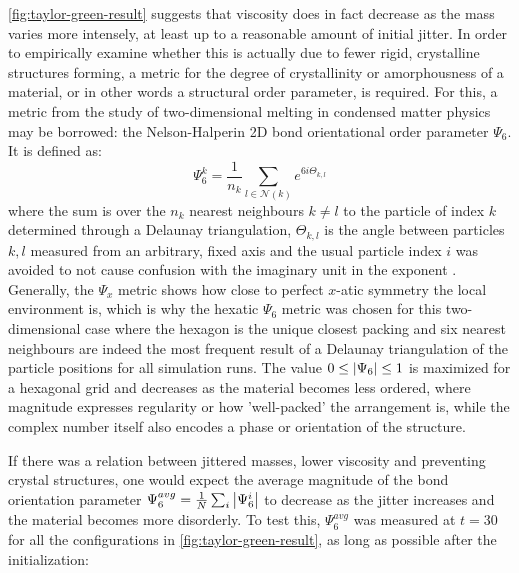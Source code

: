 \begin{samepage}


  \autoref{fig:taylor-green-result} suggests that viscosity does in fact decrease as the mass varies more intensely, at least up to a reasonable amount of initial jitter.
  In order to empirically examine whether this is actually due to fewer rigid, crystalline structures forming, a metric for the degree of crystallinity or amorphousness of a material, or in other words a structural order parameter, is required. For this, a metric from the study of two-dimensional melting in condensed matter physics may be borrowed: the Nelson-Halperin 2D bond orientational order parameter\autocite*{bond-orientational-parameter-pis-6} $\Psi_6$. It is defined as\autocite{nature-psi-6-bond-orientational}:
  \begin{equation}
    \Psi_6^k = \frac{1}{n_k} \sum_{l\in\mathcal{N}(k)}e^{6i\Theta_{k,l}}
  \end{equation}
  where the sum is over the $n_k$ nearest neighbours $k\neq l$ to the particle of index $k$ determined through a Delaunay triangulation, $\Theta_{k,l}$ is the angle between particles $k,l$ measured from an arbitrary, fixed axis and the usual particle index $i$ was avoided to not cause confusion with the imaginary unit in the exponent \autocite*{nature-psi-6-bond-orientational}. Generally, the $\Psi_x$ metric shows how close to perfect $x$-atic symmetry the local environment is, which is why the hexatic $\Psi_6$ metric was chosen for this two-dimensional case where the hexagon is the unique closest packing and six nearest neighbours are indeed the most frequent result of a Delaunay triangulation of the particle positions for all simulation runs. The value $0 \leq \left|\Psi_6\right| \leq 1$ is maximized for a hexagonal grid and decreases as the material becomes less ordered\autocite*{nature-psi-6-bond-orientational}, where magnitude expresses regularity or how 'well-packed' the arrangement is\autocite*{nicer-psi-6-bond-orientational}, while the complex number itself also encodes a phase or orientation of the structure.

  If there was a relation between jittered masses, lower viscosity and preventing crystal structures, one would expect the average magnitude of the bond orientation parameter $\Psi_6^{avg} = \frac{1}{N}\sum_i \left|\Psi_6^i\right|$ to decrease as the jitter increases and the material becomes more disorderly. To test this, $\Psi_6^{avg}$ was measured at $t=30$ for all the configurations in \autoref{fig:taylor-green-result}, as long as possible after the initialization:


\end{samepage}
